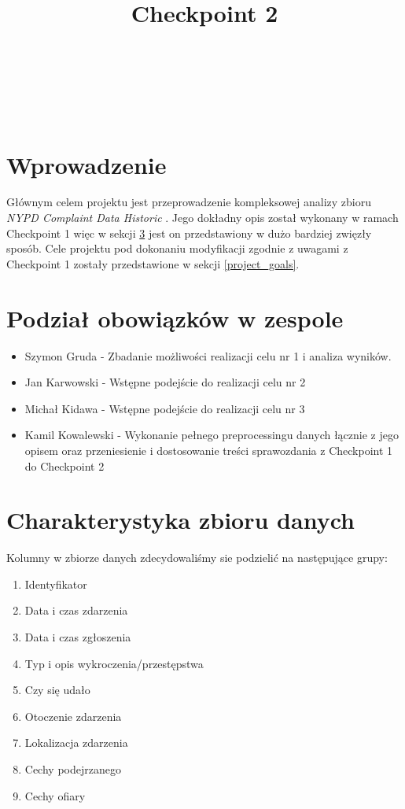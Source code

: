 \documentclass{classrep}
\author{%
    \studentinfo[239661@edu.p.lodz.pl]{Szymon Gruda}{239661}\\
    \studentinfo[239671@edu.p.lodz.pl]{Jan Karwowski}{239671}\\
    \studentinfo[239673@edu.p.lodz.pl]{Michał Kidawa}{239673}\\
    \studentinfo[239676@edu.p.lodz.pl]{Kamil Kowalewski}{239676}\\
}
\title{Checkpoint 2}
\begin{document}
    \maketitle
    \thispagestyle{fancyplain}

    \tableofcontents
    \newpage

    \section{Wprowadzenie} \label{intro} {
        Głównym celem projektu jest przeprowadzenie kompleksowej analizy zbioru
        \textit{NYPD Complaint Data Historic} \cite{nypd_dataset}. Jego dokładny opis
        został wykonany w ramach Checkpoint 1 więc w sekcji \ref{dataset_description}
        jest on przedstawiony w dużo bardziej zwięzły sposób. Cele projektu pod
        dokonaniu modyfikacji zgodnie z uwagami z Checkpoint 1 zostały przedstawione w
        sekcji \ref{project_goals}.
    }

    \section{Podział obowiązków w zespole} {
        \begin{itemize}
            \item Szymon Gruda - Zbadanie możliwości realizacji celu nr 1 i analiza wyników.
            \item Jan Karwowski - Wstępne podejście do realizacji celu nr 2
            \item Michał Kidawa - Wstępne podejście do realizacji celu nr 3
            \item Kamil Kowalewski - Wykonanie pełnego preprocessingu danych łącznie z
            jego opisem oraz przeniesienie i dostosowanie treści sprawozdania z
            Checkpoint 1 do Checkpoint 2
        \end{itemize}
    }

    \section{Charakterystyka zbioru danych} \label{dataset_description} {
        Kolumny w zbiorze danych zdecydowaliśmy sie podzielić na następujące grupy:
        \begin{enumerate}
            \item Identyfikator
            \item Data i czas zdarzenia
            \item Data i czas zgłoszenia
            \item Typ i opis wykroczenia/przestępstwa
            \item Czy się udało
            \item Otoczenie zdarzenia
            \item Lokalizacja zdarzenia
            \item Cechy podejrzanego
            \item Cechy ofiary
        \end{enumerate}
    }
\end{document}

